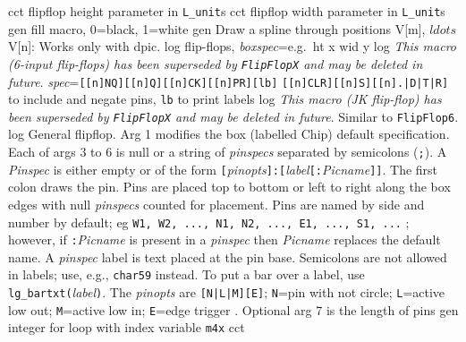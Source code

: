   {cct}
  {flipflop height parameter in {\tt L\_unit}s}
  {cct}
  {flipflop width parameter in {\tt L\_unit}s}
  {gen}
  {fill macro, 0=black, 1=white}
  {gen}
  {Draw a spline through positions V[m], $ldots$ V[n]: Works only with dpic.}
  {log}
  {flip-flops,
  {\sl boxspec}=e.g.\ ht x wid y }
  {log}
  {{\em This macro (6-input flip-flops)
    has been superseded by {\tt FlipFlopX} and may be deleted
    in future}.
    {\sl spec}={\tt [[n]NQ][[n]Q][[n]CK][[n]PR][lb]}
    {\tt [[n]CLR][[n]S][[n].|D|T|R]} to include and negate pins,
    {\tt lb} to print labels }
  {log}
  {{\em This macro (JK flip-flop)
    has been superseded by {\tt FlipFlopX} and may be deleted
    in future}.
   Similar to {\tt FlipFlop6}.}
  {log}
  {General flipflop.
   Arg 1 modifies the box (labelled Chip) default specification.
   Each of args 3 to 6 is null or a string of {\sl pinspecs}
   separated by semicolons ({\tt;}).  A {\sl Pinspec} is either empty
   or of the form
   {\tt[}{\sl pinopts}{\tt]:[}{\sl label}{\tt[:}{\sl Picname}{\tt]]}.
   The first colon draws the pin.
   Pins are placed top to bottom or left to right along the box edges with
   null {\sl pinspecs} counted for placement. Pins are named by side and number
   by default; eg {\tt W1, W2, ..., N1, N2, ..., E1, ..., S1, ...} ; however,
   if {\tt:}{\sl Picname} is present in a {\sl pinspec} then {\sl Picname}
   replaces the default name.
   A {\sl pinspec} label is text placed at the pin base. Semicolons are
   not allowed in labels; use, e.g., {\tt {}char59}
   instead.
   To put a bar over a label, use {\tt lg\_bartxt(}{\sl label}{\tt)}.
   The {\sl pinopts} are {\tt[N|L|M][E]};
 {\tt N}=pin with not circle;
 {\tt L}=active low out; {\tt M}=active low in;
 {\tt E}=edge trigger . Optional arg 7 is the length
 of pins}
  {gen}
  {integer for loop with index variable {\tt m4x} }
  {cct}

